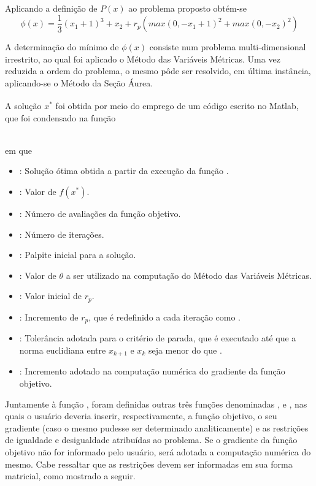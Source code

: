 \documentclass[12pt]{article}
\begin{document}
		Aplicando a definição de $ P(x) $ ao problema proposto obtém-se
		\begin{equation}
			\phi(x) = \frac{1}{3}(x_1 + 1)^3 + x_2 + r_p(max(0, -x_1 + 1)^2 + max(0, -x_2)^2)
		\end{equation}  
		
		A determinação do mínimo de $ \phi(x) $ consiste num problema multi-dimensional irrestrito, ao qual foi aplicado o Método das Variáveis Métricas. Uma vez reduzida a ordem do problema, o mesmo pôde ser resolvido, em última instância, aplicando-se o Método da Seção Áurea. 
		
		A solução $ x^* $ foi obtida por meio do emprego de um código escrito no Matlab\textsuperscript{\textregistered}, que foi condensado na função
		
		\noindent {} \\
		
		\noindent em que 
		\begin{itemize}
			\item {}: Solução ótima obtida a partir da execução da função .
			\item {}: Valor de $ f(x^*) $.
			\item {}: Número de avaliações da função objetivo.
			\item {}: Número de iterações.
			\item {}: Palpite inicial para a solução.
			\item {}: Valor de $ \theta $ a ser utilizado na computação do Método das Variáveis Métricas.
			\item {}: Valor inicial de $ r_p $.
			\item {}: Incremento de $ r_p $, que é redefinido a cada iteração como .
			\item {}: Tolerância adotada para o critério de parada, que é executado até que a norma euclidiana entre $ x_{k+1} $ e $ x_k $ seja menor do que .
			\item {}: Incremento adotado na computação numérica do gradiente da função objetivo.
 		\end{itemize}
 
 		Juntamente à função , foram definidas outras três funções denominadas ,  e , nas quais o usuário deveria inserir, respectivamente, a função objetivo, o seu gradiente (caso o mesmo pudesse ser determinado analiticamente) e as restrições de igualdade e desigualdade atribuídas ao problema. Se o gradiente da função objetivo não for informado pelo usuário, será adotada a computação numérica do mesmo. Cabe ressaltar que as restrições devem ser informadas em sua forma matricial, como mostrado a seguir.
 		
\end{document}
